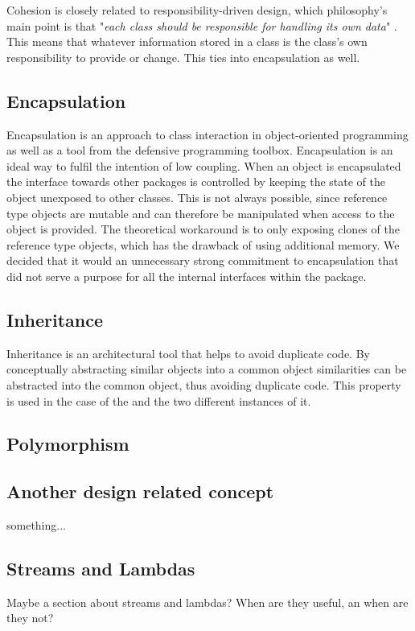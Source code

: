 Cohesion is closely related to responsibility-driven design, which philosophy's main point is that "\textit{each class should be responsible for handling its own data}" \citep{270}. This means that whatever information stored in a class is the class's own responsibility to provide or change. This ties into encapsulation as well. %

\subsection{Encapsulation}
Encapsulation is an approach to class interaction in object-oriented programming as well as a tool from the defensive programming toolbox. Encapsulation is an ideal way to fulfil the intention of low coupling. When an object is encapsulated the interface towards other packages is controlled by keeping the state of the object unexposed to other classes. This is not always possible, since reference type objects are mutable and can therefore be manipulated when access to the object is provided. The theoretical workaround is to only exposing clones of the reference type objects, which has the drawback of using additional memory. We decided that it would an unnecessary strong commitment to encapsulation that did not serve a purpose for all the internal interfaces within the  package.

\subsection{Inheritance} 
Inheritance is an architectural tool that helps to avoid duplicate code. By conceptually abstracting similar objects into a common object similarities can be abstracted into the common object, thus avoiding duplicate code. This property is used in the case of the  and the two different instances of it.

\subsection{Polymorphism} 

\subsection{Another design related concept}
something...
 
\subsection{Streams and Lambdas}
Maybe a section about streams and lambdas? When are they useful, an when are they not?


 

